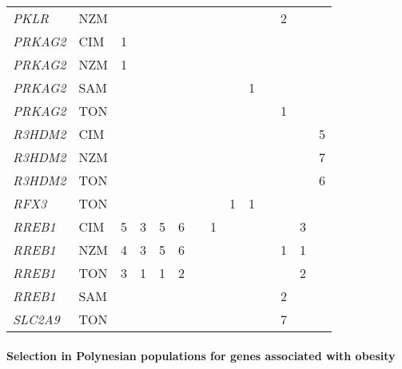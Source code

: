 \documentclass[]{report}
\let\oldparagraph\paragraph
\renewcommand{\paragraph}[1]{\oldparagraph{#1}\mbox{}}
\begin{document}
\begin{ThreePartTable}
\begin{longtable}[t]{llllllllllllll}
\em{PKLR} & NZM &  &  &  &  &  &  &  &  &  & 2 &  & \\
\em{PRKAG2} & CIM & 1 &  &  &  &  &  &  &  &  &  &  & \\
\em{PRKAG2} & NZM & 1 &  &  &  &  &  &  &  &  &  &  & \\
\em{PRKAG2} & SAM &  &  &  &  &  &  &  & 1 &  &  &  & \\
\em{PRKAG2} & TON &  &  &  &  &  &  &  &  &  & 1 &  & \\
\em{R3HDM2} & CIM &  &  &  &  &  &  &  &  &  &  &  & 5\\
\em{R3HDM2} & NZM &  &  &  &  &  &  &  &  &  &  &  & 7\\
\em{R3HDM2} & TON &  &  &  &  &  &  &  &  &  &  &  & 6\\
\em{RFX3} & TON &  &  &  &  &  &  & 1 & 1 &  &  &  & \\
\em{RREB1} & CIM & 5 & 3 & 5 & 6 &  & 1 &  &  &  &  & 3 & \\
\em{RREB1} & NZM & 4 & 3 & 5 & 6 &  &  &  &  &  & 1 & 1 & \\
\em{RREB1} & TON & 3 & 1 & 1 & 2 &  &  &  &  &  &  & 2 & \\
\em{RREB1} & SAM &  &  &  &  &  &  &  &  &  & 2 &  & \\
\em{SLC2A9} & TON &  &  &  &  &  &  &  &  &  & 7 &  & \\*
\end{longtable}
\end{ThreePartTable}

\endgroup{}

\paragraph{Selection in Polynesian populations for genes associated with
obesity}\label{selection-in-polynesian-populations-for-genes-associated-with-obesity}
\end{document}
